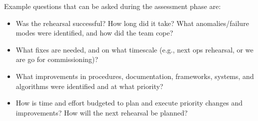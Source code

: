 Example questions that can be asked during the assessment phase are:
\begin{itemize}[topsep=-8pt]
\item Was the rehearsal successful? How long did it take? What anomalies/failure modes were identified, and how did the team cope? 
\item What fixes are needed, and on what timescale (e.g., next ops rehearsal, or we are go for commissioning)? 
\item What improvements in procedures, documentation, frameworks, systems, and algorithms were identified and at what priority?
\item How is time and effort budgeted to plan and execute priority changes and improvements? How will the next rehearsal be planned?
\end{itemize}


\clearpage



